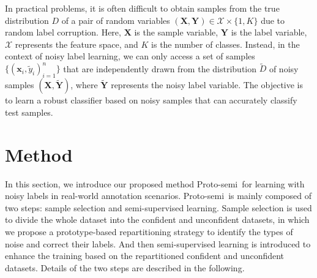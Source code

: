 \documentclass[letterpaper]{article} %
\newcommand{\method}{Proto-semi}
\begin{document}


In practical problems, it is often difficult to obtain samples from the true distribution $D$ of a pair of random variables $(\bm{X}, \bm{Y})\in\mathcal{X}\times \{1,K\}$ due to random label corruption. Here, $\bm{X}$ is the sample variable, $\bm{Y}$ is the label variable, $\mathcal{X}$ represents the feature space, and $K$ is the number of classes. Instead, in the context of noisy label learning, we can only access a set of samples $\{{({\bm{x}_{i}, \tilde{y}_{i}})_{i = 1}^{n}}\}$ that are independently drawn from the distribution $\tilde{D}$ of noisy samples $(\bm{X}, \bm{\tilde{Y}})$, where $\bm{\tilde{Y}}$ represents the noisy label variable. The objective is to learn a robust classifier based on noisy samples that can accurately classify test samples.

\section{Method}
In this section, we introduce our proposed method \method\ for learning with noisy labels in real-world annotation scenarios. \method\ is mainly composed of two steps: sample selection and semi-supervised learning. Sample selection is used to divide the whole dataset into the confident and unconfident datasets, in which we propose a prototype-based repartitioning strategy to identify the types of noise and correct their labels. And then semi-supervised learning is introduced to enhance the training based on the repartitioned confident and unconfident datasets. Details of the two steps are described in the following.
\end{document}
